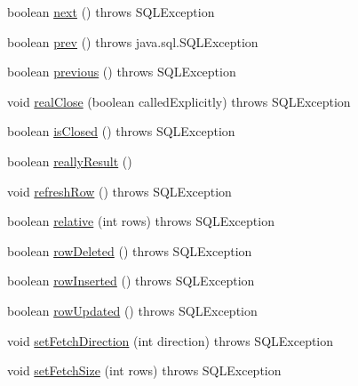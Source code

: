 \begin{DoxyCompactItemize}
boolean \mbox{\hyperlink{classcom_1_1mysql_1_1jdbc_1_1_result_set_impl_af9c00327ccf944cdcca7b610b69c5f26}{next}} ()  throws S\+Q\+L\+Exception 
\item 
boolean \mbox{\hyperlink{classcom_1_1mysql_1_1jdbc_1_1_result_set_impl_a6d8981c984b457ad7b9b38aa42db4a37}{prev}} ()  throws java.\+sql.\+S\+Q\+L\+Exception 
\item 
boolean \mbox{\hyperlink{classcom_1_1mysql_1_1jdbc_1_1_result_set_impl_ab0f6bcd9030f72eaa84132e0387e6796}{previous}} ()  throws S\+Q\+L\+Exception 
\item 
void \mbox{\hyperlink{classcom_1_1mysql_1_1jdbc_1_1_result_set_impl_ab017e327bc96791e541af9d87b228472}{real\+Close}} (boolean called\+Explicitly)  throws S\+Q\+L\+Exception 
\item 
boolean \mbox{\hyperlink{classcom_1_1mysql_1_1jdbc_1_1_result_set_impl_a39bb407e38c65cf1779e8fd341ac08b5}{is\+Closed}} ()  throws S\+Q\+L\+Exception 
\item 
boolean \mbox{\hyperlink{classcom_1_1mysql_1_1jdbc_1_1_result_set_impl_aa8f663e9020bd6661b377d8314b74964}{really\+Result}} ()
\item 
void \mbox{\hyperlink{classcom_1_1mysql_1_1jdbc_1_1_result_set_impl_af5e8cda0758ec8d39e7fc8fbd6f5b5a0}{refresh\+Row}} ()  throws S\+Q\+L\+Exception 
\item 
boolean \mbox{\hyperlink{classcom_1_1mysql_1_1jdbc_1_1_result_set_impl_a0b651b9e4f93639c884c9625b6776733}{relative}} (int rows)  throws S\+Q\+L\+Exception 
\item 
boolean \mbox{\hyperlink{classcom_1_1mysql_1_1jdbc_1_1_result_set_impl_a1b064fbd329b324c8acac4a7ef61d4b4}{row\+Deleted}} ()  throws S\+Q\+L\+Exception 
\item 
boolean \mbox{\hyperlink{classcom_1_1mysql_1_1jdbc_1_1_result_set_impl_affa56f32911dd7a8e11cb24b17afc125}{row\+Inserted}} ()  throws S\+Q\+L\+Exception 
\item 
boolean \mbox{\hyperlink{classcom_1_1mysql_1_1jdbc_1_1_result_set_impl_a6a1bb16fac14ca4cb15ad07292a371ae}{row\+Updated}} ()  throws S\+Q\+L\+Exception 
\item 
void \mbox{\hyperlink{classcom_1_1mysql_1_1jdbc_1_1_result_set_impl_a4bbd51f442eae410996aca75a318e54a}{set\+Fetch\+Direction}} (int direction)  throws S\+Q\+L\+Exception 
\item 
void \mbox{\hyperlink{classcom_1_1mysql_1_1jdbc_1_1_result_set_impl_a3d7a3b48520675c00358f995af291fbe}{set\+Fetch\+Size}} (int rows)  throws S\+Q\+L\+Exception 
\item 

\end{DoxyCompactItemize}
